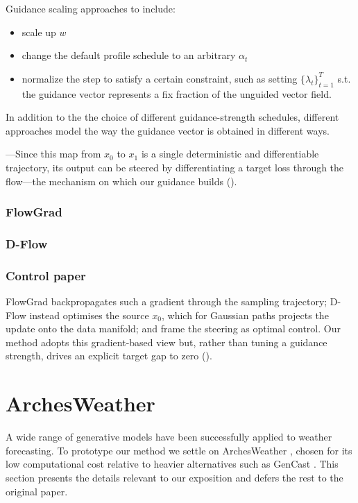 Guidance scaling approaches to include:
\begin{itemize}[noitemsep]
    \item scale up $w$
    \item change the default profile schedule to an arbitrary $\alpha_t$
    \item normalize the step to satisfy a certain constraint, such as setting $\{\lambda_t\}_{t=1}^T$ s.t. the guidance vector represents a fix fraction of the unguided vector field.
\end{itemize}


In addition to the the choice of different guidance-strength schedules, different approaches model the way the guidance vector is obtained in different ways.

---Since this map from $x_0$ to $x_1$ is a single deterministic and differentiable trajectory, its output can be steered by differentiating a
target loss through the flow---the mechanism on which our guidance builds ().

\subsubsection{FlowGrad}

\subsubsection{D-Flow}

\subsubsection{Control paper}

FlowGrad \parencite{liu2023flowgrad} backpropagates such a gradient through the sampling trajectory; D-Flow
\parencite{benhamu2024dflow} instead optimises the source $x_0$, which for Gaussian paths projects
the update onto the data manifold; and \textcite{wang2025trainingfree} frame the steering as optimal
control. Our method adopts this gradient-based view but, rather than tuning a guidance strength,
drives an explicit target gap to zero ().


\section{ArchesWeather}
A wide range of generative models have been successfully applied to weather forecasting.
To prototype our method we settle on ArchesWeather \parencite{couairon2024archesweather}, chosen for its low computational cost relative to heavier alternatives such as GenCast \parencite{price2023gencast}.
This section presents the details relevant to our exposition and defers the rest to the original paper.

